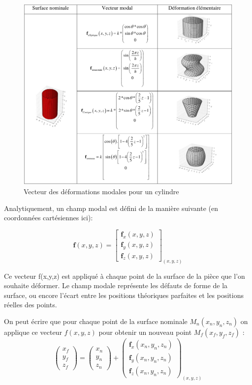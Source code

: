\documentclass[a4paper,10pt]{article}
\begin{document}
\begin{figure}[H]
   \centering   
   \includegraphics[scale=0.3]{VecteurModalCylindre.png}
      \caption{Vecteur des déformations modales pour un cylindre}
         \label{VecteurModalCylindre}
\end{figure}

Analytiquement, un champ modal est défini de la manière suivante (en coordonnées cartésiennes ici):

\begin{equation}
\textbf{f}(x,y,z) = 
\begin{bmatrix}
\textbf{f}_{x}(x,y,z) \\
\textbf{f}_{y}(x,y,z) \\
\textbf{f}_{z}(x,y,z)
\end{bmatrix}_{(x,y,z)}
\end{equation} 

Ce vecteur f(x,y,z) est appliqué à chaque point de la surface de la pièce que l'on souhaite déformer. Le champ modale représente les défauts de forme de la surface, ou encore l'écart entre les positions théoriques parfaites et les positions réelles des points. 

On peut écrire que pour chaque point de la surface nominale $ M_{n}(x_{n}, y_{n}, z_{n}) $ on applique ce vecteur $ f(x,y,z) $ pour obtenir un nouveau point $ M_{f}(x_{f}, y_{f}, z_{f}) $ :
\begin{equation}
\begin{pmatrix}
x_{f} \\
y_{f} \\
z_{f} 
\end{pmatrix} = 
\begin{pmatrix}
x_{n} \\
y_{n} \\
z_{n} 
\end{pmatrix} +
\begin{pmatrix}
\textbf{f}_{x}(x_{n},y_{n},z_{n}) \\
\textbf{f}_{y}(x_{n},y_{n},z_{n}) \\
\textbf{f}_{z}(x_{n},y_{n},z_{n})
\end{pmatrix}_{(x,y,z)}
\end{equation}
\end{document}
